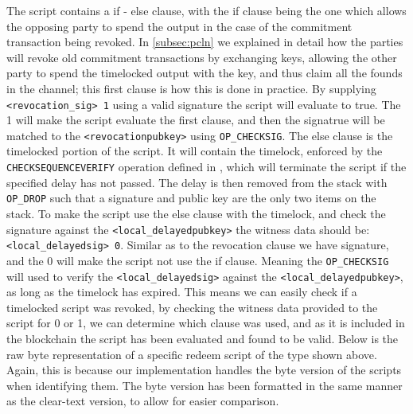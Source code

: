 The script contains a if - else clause, with the if clause being the one which allows the opposing party to spend the output in the case of the commitment transaction being revoked.  
In  \cref{subsec:pcln} we explained in detail how the parties will revoke old commitment transactions by exchanging keys, allowing the other party to spend the timelocked output with the key, and thus claim all the founds in the channel; this first clause is how this is done in practice.
By supplying {\tt <revocation\_sig> 1} using a valid signature the script will evaluate to true. The 1 will make the script evaluate the first clause, and then the signatrue will be matched to the {\tt <revocationpubkey>} using {\tt OP\_CHECKSIG}.
The else clause is the timelocked portion of the script. It will contain the timelock, enforced by the {\tt CHECKSEQUENCEVERIFY} operation defined in \cite{BIP112}, which will terminate the script if the specified delay has not passed. The delay is then removed from the stack with {\tt OP\_DROP} such that a signature and public key are the only two items on the stack. 
To make the script use the else clause with the timelock, and check the signature against the {\tt <local\_delayedpubkey>} the witness data should be: {\tt <local\_delayedsig> 0}. Similar as to the revocation clause we have signature, and the 0 will make the script not use the if clause. Meaning the {\tt OP\_CHECKSIG} will used to verify the {\tt <local\_delayedsig>} against the {\tt <local\_delayedpubkey>}, as long as the timelock has expired. This means we can easily check if a timelocked script was revoked, by checking the witness data provided to the script for 0 or 1, we can determine which clause was used, and as it is included in the blockchain the script has been evaluated and found to be valid.
Below is the raw byte representation of a specific redeem script of the type shown above. Again, this is because our implementation handles the byte version of the scripts when identifying them. The byte version has been formatted in the same manner as the clear-text version, to allow for easier comparison.
\\

\\

